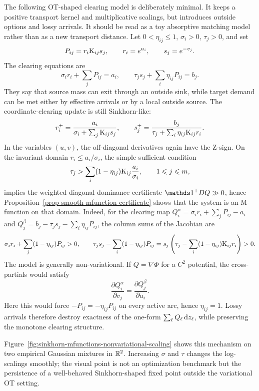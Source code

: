 \begin{example}\label{ex-lossy-sinkhorn-clearing}
	The following OT-shaped clearing model is deliberately minimal.  It keeps a positive transport kernel and multiplicative scalings, but introduces outside options and lossy arrivals.  It should be read as a toy absorptive matching model rather than as a new transport distance.  Let \(0<\eta_{ij}\leq1\), \(\sigma_i>0\), \(\tau_j>0\), and set
	\[
		P_{ij}=r_i\mathrm{K}_{ij}s_j,\qquad r_i=e^{u_i},\qquad s_j=e^{-v_j}.
	\]
	The clearing equations are
	\[
		\sigma_i r_i+\sum_jP_{ij}=a_i,
		\qquad
		\tau_j s_j+\sum_i\eta_{ij}P_{ij}=b_j.
	\]
	They say that source mass can exit through an outside sink, while target demand can be met either by effective arrivals or by a local outside source.  The coordinate-clearing update is still Sinkhorn-like:
	\[
		r_i^+=\frac{a_i}{\sigma_i+\sum_j\mathrm{K}_{ij}s_j},
		\qquad
		s_j^+=\frac{b_j}{\tau_j+\sum_i\eta_{ij}\mathrm{K}_{ij}r_i}.
	\]
	In the variables \((u,v)\), the off-diagonal derivatives again have the Z-sign.  On the invariant domain \(r_i\leq a_i/\sigma_i\), the simple sufficient condition
	\[
		\tau_j>\sum_i(1-\eta_{ij})\mathrm{K}_{ij}\frac{a_i}{\sigma_i},
		\qquad 1\leqslant j\leqslant m,
	\]
	implies the weighted diagonal-dominance certificate \(\ones^\top DQ\gg0\), hence Proposition~\ref{prop-smooth-mfunction-certificate} shows that the system is an M-function on that domain.  Indeed, for the clearing map \(Q_i^\alpha=\sigma_i r_i+\sum_jP_{ij}-a_i\) and \(Q_j^\beta=b_j-\tau_j s_j-\sum_i\eta_{ij}P_{ij}\), the column sums of the Jacobian are
	\[
		\sigma_i r_i+\sum_j(1-\eta_{ij})P_{ij}>0,
		\qquad
		\tau_j s_j-\sum_i(1-\eta_{ij})P_{ij}
		=
		s_j\left(\tau_j-\sum_i(1-\eta_{ij})\mathrm{K}_{ij}r_i\right)>0.
	\]
	The model is generally non-variational.  If \(Q=\nabla\Phi\) for a \(C^2\) potential, the cross-partials would satisfy
	\[
		\frac{\partial Q_i^\alpha}{\partial v_j}
		=
		\frac{\partial Q_j^\beta}{\partial u_i}.
	\]
	Here this would force \(-P_{ij}=-\eta_{ij}P_{ij}\) on every active arc, hence \(\eta_{ij}=1\).  Lossy arrivals therefore destroy exactness of the one-form \(\sum_\ell Q_\ell\,\mathrm{d} z_\ell\), while preserving the monotone clearing structure.
\end{example}

Figure~\ref{fig:sinkhorn-mfunctions-nonvariational-scaling} shows this mechanism on two empirical Gaussian mixtures in \(\mathbb{R}^2\).  Increasing \(\sigma\) and \(\tau\) changes the log-scalings smoothly; the visual point is not an optimization benchmark but the persistence of a well-behaved Sinkhorn-shaped fixed point outside the variational OT setting.

